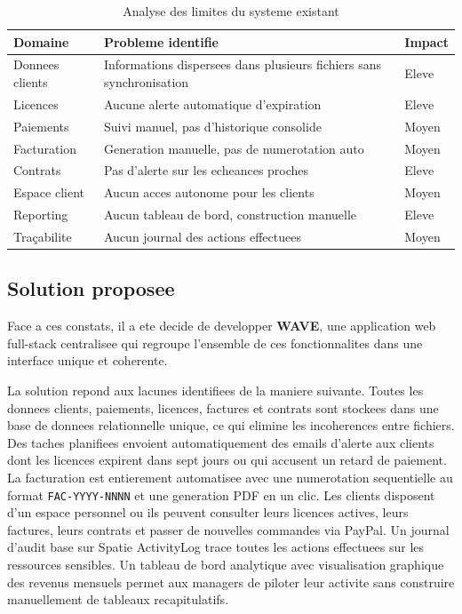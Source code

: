 \documentclass[12pt, a4paper]{report}
\newcommand{\wave}{\textbf{\color{WaveBlue}WAVE}}
\begin{document}
\vspace{0.4cm}
\begin{table}[H]
\centering
\caption{Analyse des limites du systeme existant}
\label{tab:analyse_existant}
\begin{tabularx}{\textwidth}{@{}lXl@{}}
\toprule
\textbf{Domaine} & \textbf{Probleme identifie} & \textbf{Impact} \\
\midrule
Donnees clients    & Informations dispersees dans plusieurs fichiers
                     sans synchronisation                          & Eleve \\[4pt]
Licences           & Aucune alerte automatique d'expiration        & Eleve \\[4pt]
Paiements          & Suivi manuel, pas d'historique consolide      & Moyen \\[4pt]
Facturation        & Generation manuelle, pas de numerotation auto & Moyen \\[4pt]
Contrats           & Pas d'alerte sur les echeances proches        & Eleve \\[4pt]
Espace client      & Aucun acces autonome pour les clients         & Moyen \\[4pt]
Reporting          & Aucun tableau de bord, construction manuelle  & Eleve \\[4pt]
Traçabilite        & Aucun journal des actions effectuees          & Moyen \\
\bottomrule
\end{tabularx}
\end{table}

\subsection{Solution proposee}

Face a ces constats, il a ete decide de developper \wave{}, une application
web full-stack centralisee qui regroupe l'ensemble de ces fonctionnalites dans
une interface unique et coherente.

La solution repond aux lacunes identifiees de la maniere suivante. Toutes les
donnees clients, paiements, licences, factures et contrats sont stockees dans
une base de donnees relationnelle unique, ce qui elimine les incoherences entre
fichiers. Des taches planifiees envoient automatiquement des emails d'alerte
aux clients dont les licences expirent dans sept jours ou qui accusent un
retard de paiement. La facturation est entierement automatisee avec une
numerotation sequentielle au format \texttt{FAC-YYYY-NNNN} et une generation
PDF en un clic. Les clients disposent d'un espace personnel ou ils peuvent
consulter leurs licences actives, leurs factures, leurs contrats et passer
de nouvelles commandes via PayPal. Un journal d'audit base sur Spatie
ActivityLog trace toutes les actions effectuees sur les ressources sensibles.
Un tableau de bord analytique avec visualisation graphique des revenus mensuels
permet aux managers de piloter leur activite sans construire manuellement
de tableaux recapitulatifs.
\end{document}

